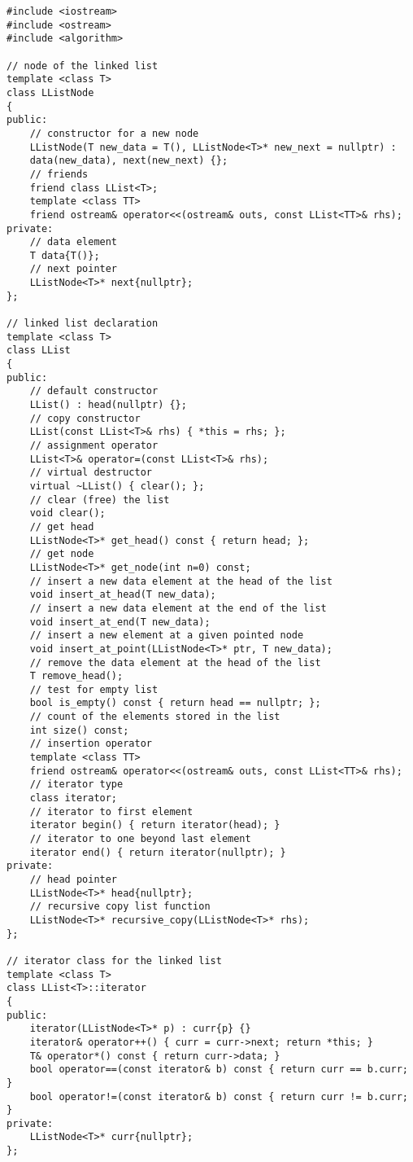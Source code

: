 \documentclass[10pt]{article}
\begin{document}
\begin{lstlisting}
#include <iostream>
#include <ostream>
#include <algorithm>

// node of the linked list
template <class T>
class LListNode
{
public:
    // constructor for a new node
    LListNode(T new_data = T(), LListNode<T>* new_next = nullptr) :
    data(new_data), next(new_next) {};
    // friends
    friend class LList<T>;
    template <class TT>
    friend ostream& operator<<(ostream& outs, const LList<TT>& rhs);
private:
    // data element
    T data{T()};
    // next pointer
    LListNode<T>* next{nullptr};
};

// linked list declaration
template <class T>
class LList
{
public:
    // default constructor
    LList() : head(nullptr) {};
    // copy constructor
    LList(const LList<T>& rhs) { *this = rhs; };
    // assignment operator
    LList<T>& operator=(const LList<T>& rhs);
    // virtual destructor
    virtual ~LList() { clear(); };
    // clear (free) the list
    void clear();
    // get head
    LListNode<T>* get_head() const { return head; };
    // get node
    LListNode<T>* get_node(int n=0) const;
    // insert a new data element at the head of the list
    void insert_at_head(T new_data);
    // insert a new data element at the end of the list
    void insert_at_end(T new_data);
    // insert a new element at a given pointed node
    void insert_at_point(LListNode<T>* ptr, T new_data);
    // remove the data element at the head of the list
    T remove_head();
    // test for empty list
    bool is_empty() const { return head == nullptr; };
    // count of the elements stored in the list
    int size() const;
    // insertion operator
    template <class TT>
    friend ostream& operator<<(ostream& outs, const LList<TT>& rhs);
    // iterator type
    class iterator;
    // iterator to first element
    iterator begin() { return iterator(head); }
    // iterator to one beyond last element
    iterator end() { return iterator(nullptr); }
private:
    // head pointer
    LListNode<T>* head{nullptr};
    // recursive copy list function
    LListNode<T>* recursive_copy(LListNode<T>* rhs);
};

// iterator class for the linked list
template <class T>
class LList<T>::iterator
{
public:
    iterator(LListNode<T>* p) : curr{p} {}
    iterator& operator++() { curr = curr->next; return *this; }
    T& operator*() const { return curr->data; }
    bool operator==(const iterator& b) const { return curr == b.curr; }
    bool operator!=(const iterator& b) const { return curr != b.curr; }
private:
    LListNode<T>* curr{nullptr};
};


\end{lstlisting}
\end{document}
